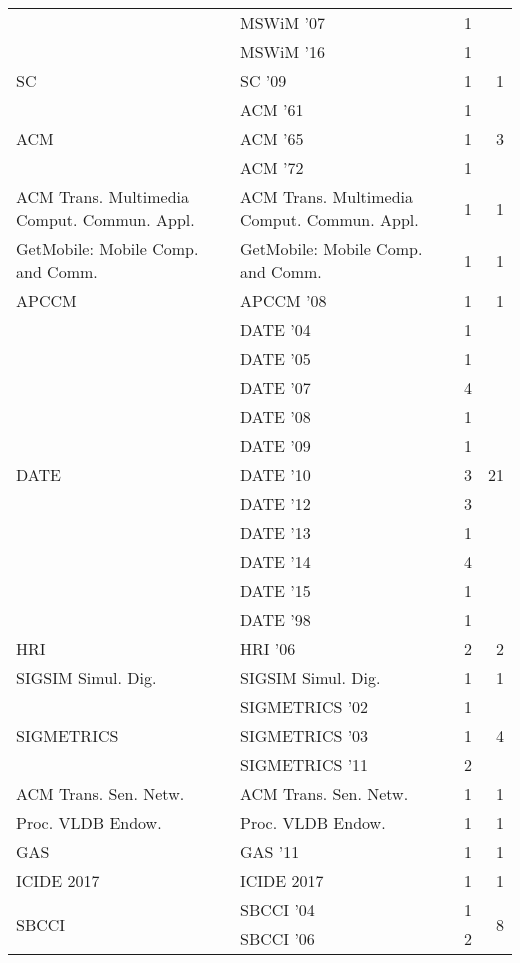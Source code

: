\begin{table*}[t]
\begin{tabular}{llrr}
& MSWiM '07 & 1 &\\
& MSWiM '16 & 1 &\\
\multirow{1}{*}{SC } & SC '09 & 1 & \multirow{1}{*}{1}\\
\multirow{3}{*}{ACM } & ACM '61 & 1 & \multirow{3}{*}{3}\\
& ACM '65 & 1 &\\
& ACM '72 & 1 &\\
\multirow{1}{*}{ACM Trans. Multimedia Comput. Commun. Appl.} & ACM Trans. Multimedia Comput. Commun. Appl. & 1 & \multirow{1}{*}{1}\\
\multirow{1}{*}{GetMobile: Mobile Comp. and Comm.} & GetMobile: Mobile Comp. and Comm. & 1 & \multirow{1}{*}{1}\\
\multirow{1}{*}{APCCM } & APCCM '08 & 1 & \multirow{1}{*}{1}\\
\multirow{11}{*}{DATE } & DATE '04 & 1 & \multirow{11}{*}{21}\\
& DATE '05 & 1 &\\
& DATE '07 & 4 &\\
& DATE '08 & 1 &\\
& DATE '09 & 1 &\\
& DATE '10 & 3 &\\
& DATE '12 & 3 &\\
& DATE '13 & 1 &\\
& DATE '14 & 4 &\\
& DATE '15 & 1 &\\
& DATE '98 & 1 &\\
\multirow{1}{*}{HRI } & HRI '06 & 2 & \multirow{1}{*}{2}\\
\multirow{1}{*}{SIGSIM Simul. Dig.} & SIGSIM Simul. Dig. & 1 & \multirow{1}{*}{1}\\
\multirow{3}{*}{SIGMETRICS } & SIGMETRICS '02 & 1 & \multirow{3}{*}{4}\\
& SIGMETRICS '03 & 1 &\\
& SIGMETRICS '11 & 2 &\\
\multirow{1}{*}{ACM Trans. Sen. Netw.} & ACM Trans. Sen. Netw. & 1 & \multirow{1}{*}{1}\\
\multirow{1}{*}{Proc. VLDB Endow.} & Proc. VLDB Endow. & 1 & \multirow{1}{*}{1}\\
\multirow{1}{*}{GAS } & GAS '11 & 1 & \multirow{1}{*}{1}\\
\multirow{1}{*}{ICIDE 2017} & ICIDE 2017 & 1 & \multirow{1}{*}{1}\\
\multirow{6}{*}{SBCCI } & SBCCI '04 & 1 & \multirow{6}{*}{8}\\
& SBCCI '06 & 2 &\\

\end{tabular}
\end{table*}
